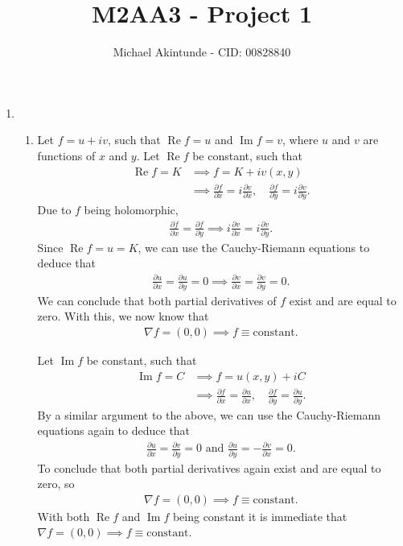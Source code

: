 \documentclass{article}
\newcommand{\real}[1] {\operatorname{Re} #1 }
\newcommand{\imag}[1] {\operatorname{Im} #1 }
\begin{document}
\title{M2AA3 - Project 1}
\author{Michael Akintunde - CID: 00828840}

\maketitle

\begin{enumerate}
\item
\begin{enumerate}
\item
 Let $f = u + iv$, such that $\real{f} = u$ and $\imag{f} = v$, where $u$ and $v$ are functions of $x$ and $y$. Let $\real{f}$ be constant, such that 
\begin{align*}
\real{f} = K 
&\implies f = K + iv(x,y) \\
&\implies \frac{\partial f}{\partial x} = i \frac{\partial v}{\partial x},\quad \frac{\partial f}{\partial y} =  i \frac{\partial v}{\partial y}.
\end{align*}
Due to $f$ being holomorphic, 
\begin{align*}
\frac{\partial f}{\partial x} = \frac{\partial f}{\partial y} \implies  i \frac{\partial v}{\partial x} = i \frac{\partial v}{\partial y}.
\end{align*}
Since $\real{f} =  u = K $, we can use the Cauchy-Riemann equations to deduce that 
\begin{align*}
\frac{\partial u}{\partial x} = \frac{\partial u}{\partial y} = 0 \implies \frac{\partial v}{\partial x} = \frac{\partial v}{\partial y} = 0.
\end{align*}
We can conclude that both partial derivatives of $f$ exist and are equal to zero. With this, we now know that
\begin{align*}
\nabla f = (0, 0) \implies f \equiv \text{constant}.
\end{align*}

 Let $\imag{f}$ be constant, such that 
\begin{align*}
\imag{f} = C 
&\implies f = u(x,y)+ iC \\
&\implies \frac{\partial f}{\partial x} = \frac{\partial u}{\partial x},\quad \frac{\partial f}{\partial y} =  \frac{\partial u}{\partial y}.
\end{align*}
By a similar argument to the above, we can use the Cauchy-Riemann equations again to deduce that
\begin{align*}
\frac{\partial u}{\partial x} = \frac{\partial v}{\partial y} = 0 \text{ and } \frac{\partial u}{\partial y} = -\frac{\partial v}{\partial x} = 0. 
\end{align*}
To conclude that both partial derivatives again exist and are equal to zero, so
\begin{align*}
\nabla f = (0, 0) \implies f \equiv \text{constant}.
\end{align*}
With both $\real{f}$ and $\imag{f}$  being constant it is immediate that $\nabla f = (0, 0) \implies f \equiv \text{constant}$.


\end{enumerate}
\end{enumerate}
\end{document}
